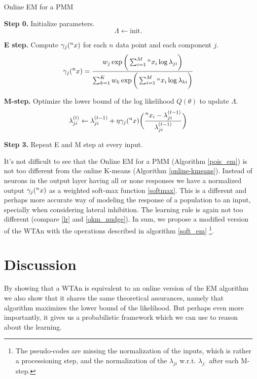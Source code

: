 \documentclass{article}
\begin{document}
\begin{algorithm}
\caption{Online EM for a PMM} \label{pois_em}
\begin{algorithmic}
\State \textbf{Step 0.} Initialize parameters.
$$
\Lambda \leftarrow \text{init.}
$$
 
\State \textbf{E step.} Compute $\gamma_j(\prescript{n}{}{x})$ for each \(n\) data point and each component \(j\).
$$
\gamma_j(\prescript{n}{}{x}) = \frac{w_j \exp{\bigg(\sum_{i=1}^M \prescript{n}{}{x_i}\log\lambda_{ji}} \bigg)}{\sum_{k=1}^K w_k \exp{\bigg(\sum_{i=1}^M \prescript{n}{}{x_i}\log\lambda_{ki}\bigg)}}
$$
 
\State \textbf{M-step.} Optimize the lower bound of the log likelihood $Q(\theta)$ to update $\Lambda$.
$$
\lambda_{ji}^{(t)} \leftarrow  \lambda_{ji}^{(t-1)} + \eta \gamma_j(\prescript{n}{}{x}) \bigg( \frac{\prescript{n}{}{x_i} - \lambda_{ji}^{(t-1)}}{\lambda_{ji}^{(t-1)}} \bigg)
$$
 
\State \textbf{Step 3.} Repeat E and M step at every input.
 
\end{algorithmic}
\end{algorithm}
 
 
It's not difficult to see that the Online EM for a PMM (Algorithm \ref{pois_em}) is not too different from the online K-means (Algorithm \ref{online-kmeans}). Instead of neurons in the output layer having all or none responses we have a normalized output $\gamma_j(\prescript{n}{}{x})$ as a weighted soft-max function \eqref{softmax}. This is a different and perhaps more accurate way of modeling the response of a population to an input, specially when considering lateral inhibition. The learning rule is again not too different (compare \eqref{lr} and \eqref{okm_nudge}). In sum, we propose a modified version of the WTAn with the operations described in algorithm \ref{soft_em} \footnote{The pseudo-codes are missing the normalization of the inputs, which is rather a processioning step, and the normalization of the $\lambda_{ji}$ w.r.t. $\lambda_{j:}$ after each M-step.}.
 
\section{Discussion}
By showing that a WTAn is equivalent to an online
version of the EM algorithm we also show that it shares the same
theoretical assurances, namely that algorithm maximizes the lower bound
of the likelihood. But perhaps even more importantly, it gives us a
probabilistic framework which we can use to reason about the learning.
 
\end{document}
